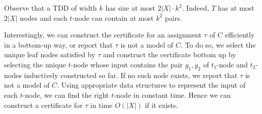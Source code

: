 \documentclass[a4paper,UKenglish,cleveref, autoref, thm-restate]{lipics-v2021}
\begin{document}
Observe that a TDD of width $k$ has size at most $2|X| \cdot k^2$. Indeed, $T$ has at most $2|X|$ nodes and each $t$-node can contain at most $k^2$ pairs.



Interestingly, we can construct the certificate for an assignment $\tau$ of $C$ efficiently in a bottom-up way, or report that $\tau$ is not a model of $C$. To do so, we select the unique leaf nodes satisfied by $\tau$ and construct the certificate bottom up by selecting the unique $t$-node whose input contains the pair $g_1,g_2$ of $t_1$-node and $t_2$-nodes inductively constructed so far. If no such node exists, we report that $\tau$ is not a model of $C$. Using appropriate data structures to represent the input of each $t$-node, we can find the right $t$-node in constant time. Hence we can construct a certificate for $\tau$ in time $O(|X|)$ if it exists.




\end{document}
